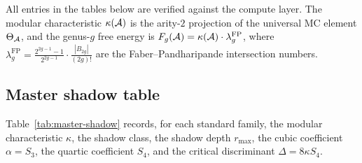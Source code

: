 All entries in the tables below are verified against the compute layer.
The modular characteristic $\kappa(\mathcal{A})$ is the arity-$2$ projection
of the universal MC element $\Theta_{\mathcal{A}}$, and the genus-$g$ free energy
is $F_g(\mathcal{A}) = \kappa(\mathcal{A}) \cdot \lambda_g^{\mathrm{FP}}$, where
$\lambda_g^{\mathrm{FP}} = \frac{2^{2g-1}-1}{2^{2g-1}}
\cdot \frac{|B_{2g}|}{(2g)!}$
are the Faber--Pandharipande intersection numbers.

\subsection{Master shadow table}\label{ssec:master-shadow-table}

Table~\ref{tab:master-shadow} records, for each standard family,
the modular characteristic $\kappa$, the shadow class, the shadow
depth $r_{\max}$, the cubic coefficient $\alpha = S_3$, the quartic
coefficient $S_4$, and the critical discriminant $\Delta = 8\kappa S_4$.

